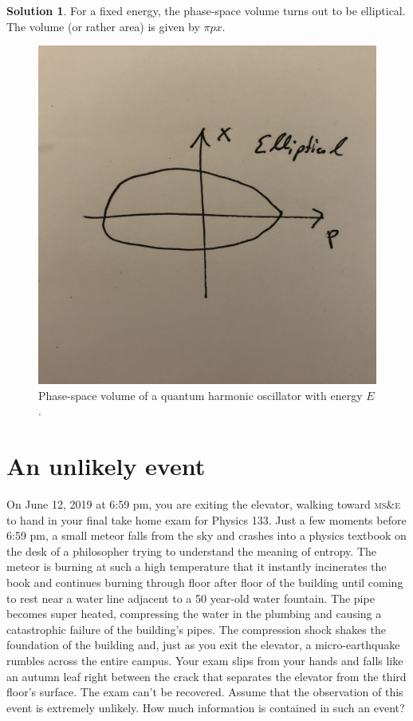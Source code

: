 \documentclass[11pt]{article}
\theoremstyle{definition}
\newtheorem*{solution}{Solution}
\numberwithin{equation}{section}
\numberwithin{figure}{section}
\begin{document}
\begin{solution}
For a fixed energy, the phase-space volume turns out to be elliptical. The volume (or rather area) is given by $\pi p x$.

\begin{figure}[h!]
	\centering
	\includegraphics[width=.3\linewidth]{Final_Fig6}
	\caption{Phase-space volume of a quantum harmonic oscillator with energy $E$.}
\end{figure}

\end{solution}























\newpage
\section{An unlikely event}

On June 12, 2019 at 6:59 pm, you are exiting the elevator, walking toward \textsc{ms\&e} to hand in your final take home exam for Physics 133. Just a few moments before 6:59 pm, a small meteor falls from the sky and crashes into a physics textbook on the desk of a philosopher trying to understand the meaning of entropy. The meteor is burning at such a high temperature that it instantly incinerates the book and continues burning through floor after floor of the building until coming to rest near a water line adjacent to a 50 year-old water fountain. The pipe becomes super heated, compressing the water in the plumbing and causing a catastrophic failure of the building’s pipes. The compression shock shakes the foundation of the building and, just as you exit the elevator, a micro-earthquake rumbles across the entire campus. Your exam slips from your hands and falls like an autumn leaf right between the crack that separates the elevator from the third floor's surface. The exam can't be recovered. Assume that the observation of this event is extremely unlikely. How much information is contained in such an event?
\end{document}
